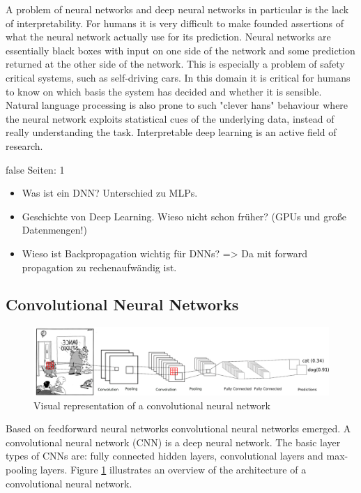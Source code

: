 \documentclass[draft,final,oneside]{vutinfth} %
\begin{document}
A problem of neural networks and deep neural networks in particular is the lack of interpretability. For humans it is very difficult to make founded assertions of what the neural network actually use for its prediction. Neural networks are essentially black boxes with input on one side of the network and some prediction returned at the other side of the network. This is especially a problem of safety critical systems, such as self-driving cars. In this domain it is critical for humans to know on which basis the system has decided and whether it is sensible. Natural language processing is also prone to such "clever hans" behaviour \cite{cleverhans} where the neural network exploits statistical cues of the underlying data, instead of really understanding the task. Interpretable deep learning is an active field of research. \cite{interpretabledl}

\if false
Seiten: 1
\begin{itemize}
\item Was ist ein DNN? Unterschied zu MLPs.
\item Geschichte von Deep Learning. Wieso nicht schon früher? (GPUs und große Datenmengen!)
\item Wieso ist Backpropagation wichtig für DNNs? => Da mit forward propagation zu rechenaufwändig ist.
\end{itemize}
\fi

\subsection{Convolutional Neural Networks} \label{mlcnn}

\begin{figure}[ht]
	\centering
  	\includegraphics[width=1.0\textwidth]{graphics/cnn.png}
	\caption{Visual representation of a convolutional neural network}
	\label{fig:cnn}
\end{figure}

Based on feedforward neural networks convolutional neural networks emerged. A convolutional neural network (CNN) is a deep neural network. The basic layer types of CNNs are: fully connected hidden layers, convolutional layers and max-pooling layers. Figure \ref{fig:cnn} illustrates an overview of the architecture of a convolutional neural network.
\end{document}
